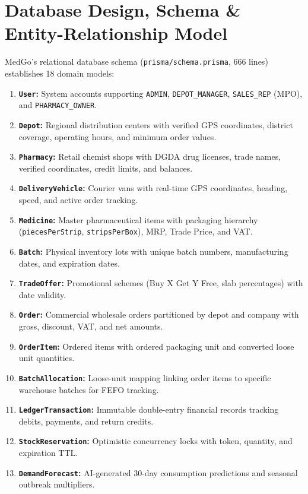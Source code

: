 \documentclass[10pt,a4paper]{article}
\begin{document}
\section{Database Design, Schema \& Entity-Relationship Model}
MedGo's relational database schema (\texttt{prisma/schema.prisma}, 666 lines) establishes 18 domain models:
\begin{enumerate}[leftmargin=*]
    \item \textbf{\texttt{User}:} System accounts supporting \texttt{ADMIN}, \texttt{DEPOT\_MANAGER}, \texttt{SALES\_REP} (MPO), and \texttt{PHARMACY\_OWNER}.
    \item \textbf{\texttt{Depot}:} Regional distribution centers with verified GPS coordinates, district coverage, operating hours, and minimum order values.
    \item \textbf{\texttt{Pharmacy}:} Retail chemist shops with DGDA drug licenses, trade names, verified coordinates, credit limits, and balances.
    \item \textbf{\texttt{DeliveryVehicle}:} Courier vans with real-time GPS coordinates, heading, speed, and active order tracking.
    \item \textbf{\texttt{Medicine}:} Master pharmaceutical items with packaging hierarchy (\texttt{piecesPerStrip}, \texttt{stripsPerBox}), MRP, Trade Price, and VAT.
    \item \textbf{\texttt{Batch}:} Physical inventory lots with unique batch numbers, manufacturing dates, and expiration dates.
    \item \textbf{\texttt{TradeOffer}:} Promotional schemes (Buy X Get Y Free, slab percentages) with date validity.
    \item \textbf{\texttt{Order}:} Commercial wholesale orders partitioned by depot and company with gross, discount, VAT, and net amounts.
    \item \textbf{\texttt{OrderItem}:} Ordered items with ordered packaging unit and converted loose unit quantities.
    \item \textbf{\texttt{BatchAllocation}:} Loose-unit mapping linking order items to specific warehouse batches for FEFO tracking.
    \item \textbf{\texttt{LedgerTransaction}:} Immutable double-entry financial records tracking debits, payments, and return credits.
    \item \textbf{\texttt{StockReservation}:} Optimistic concurrency locks with token, quantity, and expiration TTL.
    \item \textbf{\texttt{DemandForecast}:} AI-generated 30-day consumption predictions and seasonal outbreak multipliers.

\end{enumerate}
\end{document}

